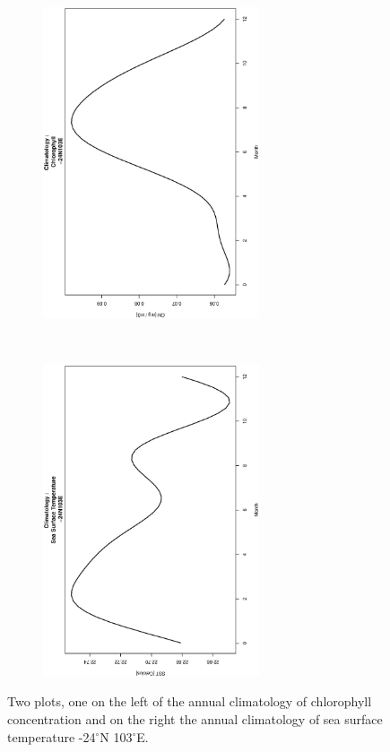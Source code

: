\begin{figure}[ht]
    \centering
    \begin{subfigure}[t]{0.5\textwidth}
        \centering
        \includegraphics[width=0.7\textwidth, angle =-90]{Chapter3/-24,103/Data_-24N103E_Chl_Climatology.eps}
    \end{subfigure}%
    ~ 
    \begin{subfigure}[t]{0.5\textwidth}
        \centering
        \includegraphics[width=0.7\textwidth, angle =-90]{Chapter3/-24,103/Data_-24N103E_SST_Climatology.eps}
    \end{subfigure}
    \caption{Two plots, one on the left of the annual climatology of chlorophyll concentration and on the right the annual climatology of sea surface temperature -24$^{\circ}$N 103$^{\circ}$E.}\label{fig:clim-24,103}
\end{figure}


